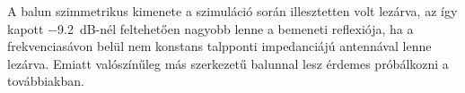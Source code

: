 A balun szimmetrikus kimenete a szimuláció során illesztetten volt lezárva, az így kapott \SI{-9,2}{dB}-nél feltehetően nagyobb lenne a bemeneti reflexiója, ha a frekvenciasávon belül nem konstans talpponti impedanciájú antennával lenne lezárva. Emiatt valószínűleg más szerkezetű balunnal lesz érdemes próbálkozni a továbbiakban.